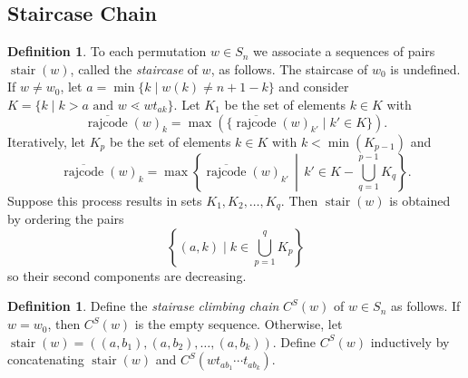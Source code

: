 \documentclass[11pt]{amsart}
\theoremstyle{definition}
\newtheorem{definition}[theorem]{Definition}
\theoremstyle{named}
\newcommand{\CS}{C^S}
\DeclareMathOperator{\rr}{\mathrm{rajcode}} %
\newcommand{\orr}{\overline{\rr}} %
\DeclareMathOperator{\stair}{\mathrm{stair}}
\begin{document}
	\subsection{Staircase Chain}
	\label{sec:stair}
	\begin{definition}
		To each permutation $w\in S_n$ we associate a sequences of pairs $\stair(w)$, called the \emph{staircase} of $w$, as follows. The staircase of $w_0$ is undefined. If $w\neq w_0$, let
		$a=\min\{k\mid w(k)\neq n+1-k\}$ and consider $K=\{k\mid k>a\mbox{ and }w\lessdot wt_{ak}\}$.
		Let $K_1$ be the set of elements $k\in K$ with
		\[\orr(w)_k=\max(\{\orr(w)_{k'}\mid k'\in K \}).\]
		Iteratively, let $K_p$ be the set of elements $k\in K$ with $k<\min(K_{p-1})$ and
		\[\orr(w)_k=\max\left\{\orr(w)_{k'}\,\middle|\, k'\in K-\bigcup_{q=1}^{p-1}K_q \right\}.\]
		Suppose this process results in sets $K_1,K_2,\ldots,K_q$.		
		Then $\stair(w)$ is obtained by ordering the pairs
		\[\left\{(a,k)\mid k\in \bigcup_{p=1}^q K_p\right\} \]
		so their second components are decreasing.
	\end{definition}

	\begin{definition}
		Define the \emph{stairase climbing chain} $\CS(w)$ of $w\in S_n$ as follows. If $w=w_0$, then $\CS(w)$ is the empty sequence. Otherwise, let $\stair(w)=((a,b_1),(a,b_2),\ldots,(a,b_k))$. Define $\CS(w)$ inductively by concatenating $\stair(w)$ and $\CS(wt_{ab_1}\cdots t_{ab_k})$.
	\end{definition}
\end{document}

